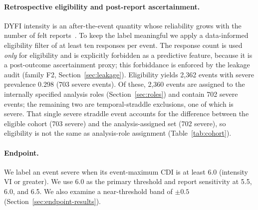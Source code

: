 \documentclass[pdflatex,sn-basic,iicol]{sn-jnl}
\begin{document}
\paragraph{Retrospective eligibility and post-report ascertainment.} DYFI
intensity is an after-the-event quantity whose reliability grows with the number
of felt reports~\citep{quitoriano2020dyfi}. To keep the label meaningful we apply
a data-informed eligibility filter of at least ten responses per event. The
response count is used \emph{only} for eligibility and is explicitly forbidden as
a predictive feature, because it is a post-outcome ascertainment proxy; this
forbiddance is enforced by the leakage audit (family F2,
Section~\ref{sec:leakage}). Eligibility yields 2{,}362 events with severe
prevalence 0.298 (703 severe events). Of these, 2{,}360 events are assigned to
the internally specified analysis roles (Section~\ref{sec:roles}) and contain 702 severe
events; the remaining two are temporal-straddle exclusions, one of which is
severe. That single severe straddle event accounts for the difference between the
eligible cohort (703 severe) and the analysis-assigned set (702 severe), so
eligibility is not the same as analysis-role assignment (Table~\ref{tab:cohort}).

\paragraph{Endpoint.} We label an event severe when its event-maximum CDI is at
least 6.0 (intensity VI or greater). We use 6.0 as the primary threshold and
report sensitivity at 5.5, 6.0, and 6.5. We also examine a near-threshold band
of $\pm0.5$ (Section~\ref{sec:endpoint-results}).
\end{document}

